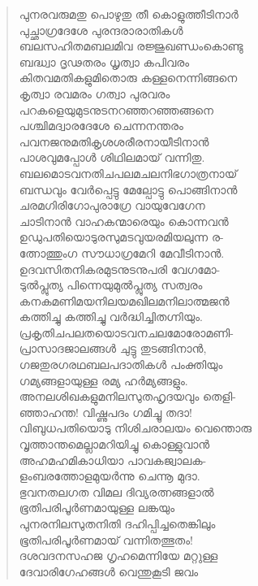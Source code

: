 \begin{verse}
പുനരവരുമതു പൊഴുതു തീ കൊളുത്തീടിനാര്‍\\
പുച്ഛാഗ്രദേശേ പുരന്ദരാരാതികള്‍\\
ബലസഹിതമബലമിവ രജ്ജുഖണ്ഡംകൊണ്ടു\\
ബദ്ധ്വാ ദൃഢതരം ധൃത്വാ കപിവരം\\
കിതവമതികളുമിതൊരു കള്ളനെന്നിങ്ങനെ\\
കൃത്വാ രവമരം ഗത്വാ പുരവരം\\
പറകളെയുമുടനുടനറഞ്ഞറഞ്ഞങ്ങനെ\\
പശ്ചിമദ്വാരദേശേ ചെന്നനന്തരം\\
പവനജനുമതികൃശശരീരനായീടിനാന്‍\\
പാശവുമപ്പോള്‍ ശിഥിലമായ് വന്നിതു.\\
ബലമൊടവനതിചപലമചലനിഭഗാത്രനായ്\\
ബന്ധവും വേര്‍പ്പെട്ടു മേല്പോട്ടു പൊങ്ങിനാന്‍\\
ചരമഗിരിഗോപുരാഗ്രേ വായുവേഗേന\\
ചാടിനാന്‍ വാഹകന്മാരെയും കൊന്നവന്‍\\
ഉഡുപതിയൊടുരസുമടവുയരമിയലുന്ന ര-\\
ത്നോത്തുംഗ സൗധാഗ്രമേറി മേവീടിനാന്‍.\\
ഉദവസിതനികരമുടനുടനുപരി വേഗമോ-\\
ടുല്‍പ്ലുത്യ പിന്നെയുമുല്‍പ്ലുത്യ സത്വരം\\
കനകമണിമയനിലയമഖിലമനിലാത്മജന്‍\\
കത്തിച്ചു കത്തിച്ചു വര്‍ദ്ധിച്ചിതഗ്നിയും.\\
പ്രകൃതിചപലതയൊടവനചലമോരോമണി-\\
പ്രാസാദജാലങ്ങള്‍ ചുട്ടു തുടങ്ങിനാന്‍,\\
ഗജതുരഗരഥബലപദാതികള്‍ പംക്തിയും\\
ഗമ്യങ്ങളായുള്ള രമ്യ ഹര്‍മ്യങ്ങളും.\\
അനലശിഖകളുമനിലസുതഹൃദയവും തെളി-\\
ഞ്ഞാഹന്ത! വിഷ്ണുപദം ഗമിച്ചൂ തദാ!\\
വിബുധപതിയൊടു നിശിചരാലയം വെന്തൊരു\\
വൃത്താന്തമെല്ലാമറിയിച്ചു കൊള്ളുവാന്‍\\
അഹമഹമികാധിയാ പാവകജ്വാലക-\\
ളംബരത്തോളമുയര്‍ന്നു ചെന്നൂ മുദാ.\\
ഭുവനതലഗത വിമല ദിവ്യരത്നങ്ങളാല്‍\\
ഭൂതിപരിപൂര്‍ണമായുള്ള ലങ്കയും\\
പുനരനിലസുതനിതി ദഹിപ്പിച്ചതെങ്കിലും\\
ഭൂതിപരിപൂര്‍ണമായ് വന്നിതത്ഭുതം!\\
ദശവദനസഹജ ഗൃഹമെന്നിയേ മറ്റുള്ള\\
ദേവാരിഗേഹങ്ങള്‍ വെന്തുകൂടി ജവം\\

\end{verse}
